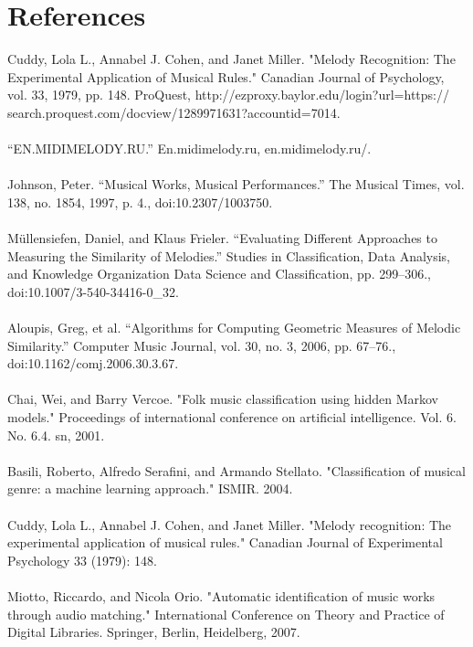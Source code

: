\documentclass{article}
\begin{document}
	\section{References}
	Cuddy, Lola L., Annabel J. Cohen, and Janet Miller. "Melody Recognition: The Experimental Application of Musical Rules." Canadian Journal of Psychology, vol. 33, 1979, pp. 148. ProQuest, http://ezproxy.baylor.edu/login?url=https://\\search.proquest.com/docview/1289971631?accountid=7014.
	\\ \\
	“EN.MIDIMELODY.RU.” En.midimelody.ru, en.midimelody.ru/.
	\\ \\
	Johnson, Peter. “Musical Works, Musical Performances.” The Musical Times, vol. 138, no. 1854, 1997, p. 4., doi:10.2307/1003750.
	\\ \\
	Müllensiefen, Daniel, and Klaus Frieler. “Evaluating Different Approaches to Measuring the Similarity of Melodies.” Studies in Classification, Data Analysis, and Knowledge Organization Data Science and Classification, pp. 299–306., doi:10.1007/3-540-34416-0\_32.
	\\ \\
	Aloupis, Greg, et al. “Algorithms for Computing Geometric Measures of Melodic Similarity.” Computer Music Journal, vol. 30, no. 3, 2006, pp. 67–76., \\doi:10.1162/comj.2006.30.3.67.
	\\ \\
	Chai, Wei, and Barry Vercoe. "Folk music classification using hidden Markov models." Proceedings of international conference on artificial intelligence. Vol. 6. No. 6.4. sn, 2001.
	\\ \\
	Basili, Roberto, Alfredo Serafini, and Armando Stellato. "Classification of musical genre: a machine learning approach." ISMIR. 2004.
	\\ \\
	Cuddy, Lola L., Annabel J. Cohen, and Janet Miller. "Melody recognition: The experimental application of musical rules." Canadian Journal of Experimental Psychology 33 (1979): 148.
	\\ \\
	Miotto, Riccardo, and Nicola Orio. "Automatic identification of music works through audio matching." International Conference on Theory and Practice of Digital Libraries. Springer, Berlin, Heidelberg, 2007.
	\\ \\
\end{document}
